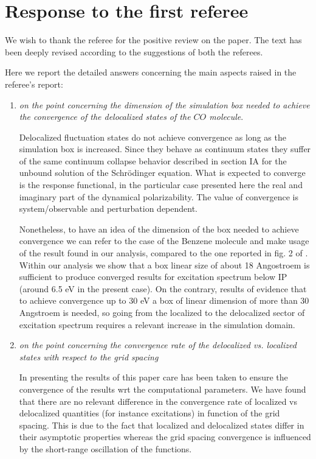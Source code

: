 \documentclass[11pt,a4paper]{article}
\begin{document}
\section*{Response to the first referee}

We wish to thank the referee for the positive review on the paper. The text has been deeply revised according to the suggestions of both the referees.

Here we report the detailed answers concerning the main aspects raised in the referee's report:
\begin{enumerate}
  \item \emph{on the point concerning the dimension of the simulation box needed to achieve the convergence of the delocalized states of the $CO$ molecule}.

  Delocalized fluctuation states do not achieve convergence as long as the simulation box is increased. Since they behave as continuum states they suffer of the same continuum collapse behavior described in section IA for the unbound solution of the Schr\"odinger equation. What is expected to converge is the response functional, in the particular case presented here the real and imaginary part of the dynamical polarizability.
  The value of convergence is system/observable and perturbation dependent.

  Nonetheless, to have an idea of the dimension of the box needed to achieve convergence we can refer to the case of the Benzene molecule and make usage
  of the result found in our analysis, compared to the one reported in fig. 2 of \cite{baroni2008}. Within our analysis we show that a box linear size of about 18 Angostroem is sufficient to produce converged results for excitation spectrum below IP (around 6.5 eV in the present case). On the contrary, results of \cite{baroni2008} evidence that to achieve convergence up to 30 eV a box of linear dimension of more than 30 Angstroem is needed, so going from the localized to the delocalized sector of excitation spectrum requires a relevant increase in the simulation domain.

  \item \emph{on the point concerning the convergence rate of the delocalized vs. localized states with respect
  to the grid spacing}

 In presenting the results of this paper care has been taken to ensure the convergence of the results wrt the computational parameters. We have found that there are no relevant difference in the convergence rate of localized vs delocalized quantities (for instance excitations) in function of the grid spacing. This is due to the fact that localized and delocalized states differ in their asymptotic properties whereas the grid spacing convergence is influenced by the short-range oscillation of the functions.


\end{enumerate}
\end{document}
